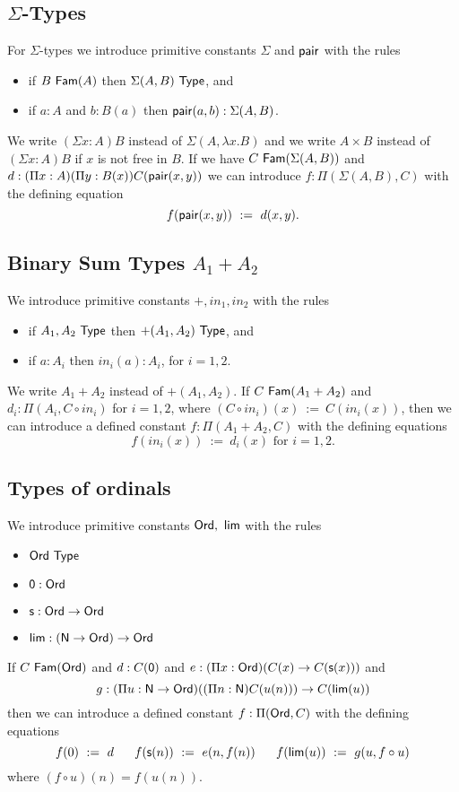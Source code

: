 \documentclass[10pt,a4paper]{article}
\newcommand{\Type}{{\sf Type}}
\newcommand{\PAIR}{{\sf pair}}
\newcommand{\suc}{{\sf s}}
\newcommand{\NN}{{\sf N}}
\newcommand{\Ord}{{\sf Ord}}
\newcommand{\LIM}{{\sf lim}}
\newcommand{\zero}{{\sf 0}}
\newcommand{\Fam}{{\sf Fam}}
\begin{document}
\subsection*{$\Sigma$-Types}
For $\Sigma$-types we introduce primitive constants $\Sigma$ and $\PAIR$ with the rules
\begin{itemize}
\item if $B~\Fam(A)$ then $\Sigma(A,B)~\Type$, and
\item if $a:A$ and $b:B(a)$ then $\PAIR(a,b):\Sigma(A,B)$.
\end{itemize}
We write $(\Sigma x:A)B$ instead
of $\Sigma(A,\lambda x.B)$ and we write $A\times B$ instead of $(\Sigma x:A)B$ if
$x$ is not free in $B$.  If we have $C~\Fam(\Sigma(A,B))$ and
$
d:(\Pi x:A)(\Pi y:B(x))C(\PAIR(x,y))
$
we can introduce $f:\Pi(\Sigma(A,B),C)$ with the defining equation
$$
f(\PAIR(x,y))~:=~d(x,y).
$$

\medskip

\subsection*{Binary Sum Types $A_1+A_2$}
We introduce primitive constants $+,in_1,in_2$ with the rules
\begin{itemize}
\item if $A_1,A_2~\Type$ then $+(A_1,A_2)~\Type$, and
\item if $a:A_i$ then $in_i(a):A_i$, for $i=1,2$.
\end{itemize}
We write $A_1+A_2$ instead of $+(A_1,A_2)$.
If $C~\Fam(A_1+A_2)$ and $d_i:\Pi(A_i,C\circ in_i)$ for $i=1,2$, where 
$(C\circ in_i)(x)~:=~C(in_i(x))$, then we can introduce a defined constant $f:\Pi(A_1+A_2,C)$ with the defining equations
  \[ f(in_i(x))~:= ~d_i(x)\mbox{ for } i=1,2.\]

\subsection*{Types of ordinals}
We introduce primitive constants $\Ord,~\LIM$ with the rules
\begin{itemize}
\item $\Ord~\Type$
\item $\zero:\Ord$
\item $\suc:\Ord\rightarrow\Ord$
\item $\LIM:(\NN\rightarrow\Ord)\rightarrow\Ord$
\end{itemize}
If $C~\Fam(\Ord)$ and $d:C(\zero)$ and $e:(\Pi x:\Ord)(C(x)\rightarrow C(\suc(x)))$ and
$$g:(\Pi u:\NN\rightarrow\Ord)((\Pi n:\NN)C(u(n)))\rightarrow C(\LIM(u))$$
then we can introduce a defined constant $f:\Pi(\Ord,C)$ with the defining equations
$$
f(0) ~:=~ d~~~~~f(\suc(n)) ~:=~ e(n,f(n))~~~~~f(\LIM(u)) ~:=~ g(u,f\circ u)
$$
where $(f\circ u)(n) = f(u(n))$.
\end{document}
